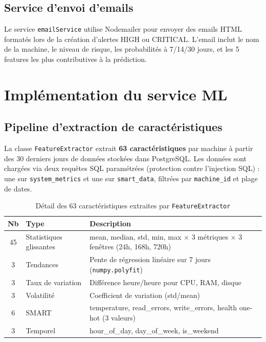 \subsection{Service d'envoi d'emails}

Le service \texttt{emailService} utilise Nodemailer pour envoyer des emails HTML
formatés lors de la création d'alertes HIGH ou CRITICAL. L'email inclut le nom de
la machine, le niveau de risque, les probabilités à 7/14/30 jours, et les 5 features
les plus contributives à la prédiction.

\section{Implémentation du service ML}

\subsection{Pipeline d'extraction de caractéristiques}

La classe \texttt{FeatureExtractor} extrait \textbf{63 caractéristiques} par machine
à partir des 30 derniers jours de données stockées dans PostgreSQL. Les données sont
chargées via deux requêtes SQL paramétrées (protection contre l'injection SQL) :
une sur \texttt{system\_metrics} et une sur \texttt{smart\_data}, filtrées par
\texttt{machine\_id} et plage de dates.

\begin{table}[H]
\centering
\caption{Détail des 63 caractéristiques extraites par \texttt{FeatureExtractor}}
\begin{tabularx}{\textwidth}{|c|l|X|}
\hline
\rowcolor{lightblue}
\textbf{Nb} & \textbf{Type} & \textbf{Description} \\
\hline
45 & Statistiques glissantes & mean, median, std, min, max $\times$ 3 métriques $\times$ 3 fenêtres (24h, 168h, 720h) \\
\hline
3  & Tendances & Pente de régression linéaire sur 7 jours (\texttt{numpy.polyfit}) \\
\hline
3  & Taux de variation & Différence heure/heure pour CPU, RAM, disque \\
\hline
3  & Volatilité & Coefficient de variation (std/mean) \\
\hline
6  & SMART & temperature, read\_errors, write\_errors, health one-hot (3 valeurs) \\
\hline
3  & Temporel & hour\_of\_day, day\_of\_week, is\_weekend \\
\hline
\end{tabularx}
\end{table}

